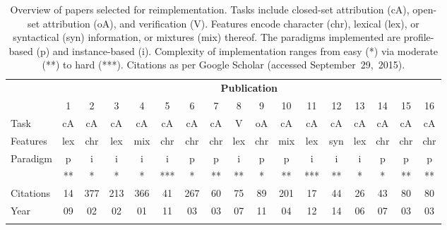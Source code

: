 \begin{table*}[tb]%
\small%
\centering%
\renewcommand{\arraystretch}{0.8}%
\renewcommand{\tabcolsep}{2.9pt}%
\caption{Overview of papers selected for reimplementation. Tasks include closed-set attribution (cA), open-set attribution (oA), and verification (V). Features encode character (chr), lexical (lex), or syntactical (syn) information, or mixtures (mix) thereof. The paradigms implemented are profile-based (p) and instance-based (i). Complexity of implementation ranges from easy (*) via moderate (**) to hard (***). Citations as per Google Scholar (accessed September~29,~2015).}%
\label{table-paper-selection}%
\vspace{2ex}%
\begin{tabular}{@{}lcccccccccccccccc@{}}
\addlinespace[-4pt]
\toprule
& \multicolumn{16}{c}{\bfseries Publication} \\
                            &  1  &  2  &  3  &  4  &  5  &  6  &  7  &  8  &  9  &  10 &  11 &  12 &  13 &  14 &  15 &  16 \\
\midrule
Task                        & cA  & cA  & cA  & cA  & cA  & cA  & cA  &  V  & oA  & cA  & cA  & cA  & cA  & cA  & cA  & cA  \\
Features                    & lex & chr & lex & mix & chr & chr & chr & lex & chr & mix & lex & syn & lex & chr & chr & chr \\
Paradigm                    &  p  &  i  &  i  &  i  &  i  &  p  &  p  &  i  &  p  &  p  &  i  &  i  &  i  &  p  &  p  &  p  \\[.25ex]
\raisebox{.5ex}{Complexity} & **  &  *  &  *  &  *  & *** &  *  & **  & **  &  *  & **  & *** & **  &  *  &  *  & **  & **  \\[-.5ex]
Citations                   &  14 & 377 & 213 & 366 &  41 & 267 &  60 &  75 &  89 & 201 &  17 &  44 &  26 &  43 &  80 &  80 \\
Year                        &  09 &  02 &  02 &  01 &  11 &  03 &  03 &  07 &  11 &  04 &  12 &  14 &  06 &  07 &  03 &  03 \\
\bottomrule
\addlinespace
\end{tabular}%
\end{table*}
